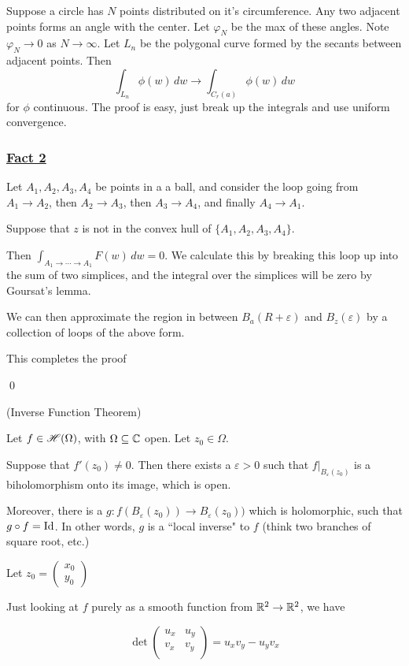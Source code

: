 \documentclass[x11names,reqno,14pt]{extarticle}
\newcommand{\oo}{{\infty}}
\begin{document}
Suppose a circle has $N$ points distributed on it's circumference. Any two adjacent points forms an angle with the center. Let $\varphi_N$ be the max of these angles. Note $\varphi_N\to0$ as $N\to\oo$. Let $L_n$ be the polygonal curve formed by the secants between adjacent points. Then 
\[
\int_{L_n}\phi(w)\, dw \to \int_{C_r(a)}\phi(w)\,dw
\]
for $\phi$ continuous. The proof is easy, just break up the integrals and use uniform convergence. 

\subsubsection*{\underline{Fact 2}}

Let $A_1, A_2, A_3, A_4$ be points in a a ball, and consider the loop going from $A_1\to A_2$, then $A_2\to A_3$, then $A_3\to A_4$, and finally $A_4\to A_1$. 

Suppose that $z$ is not in the convex hull of $\{A_1, A_2, A_3, A_4\}$. 

Then $\int_{A_1\to\cdots\to A_1}F(w)\,dw = 0$. We calculate this by breaking this loop up into the sum of two simplices, and the integral over the simplices will be zero by Goursat's lemma. 

We can then approximate the region in between $B_a(R + \varepsilon)$ and $B_z(\varepsilon)$ by a collection of loops of the above form. 

This completes the proof

\qed

\thm (Inverse Function Theorem)

Let $f \in \mathscr{H}(\Omega)$, with $\Omega\subseteq \mathbb{C}$ open. Let $z_0 \in \Omega$. 

Suppose that $f'(z_0) \neq 0$. Then there exists a $\varepsilon>0$ such that $f|_{B_\varepsilon(z_0)}$ is a biholomorphism onto its image, which is open. 

Moreover, there is a $g:f(B_{\varepsilon}(z_0))\to B_{\varepsilon}(z_0))$ which is holomorphic, such that $g \circ f = \operatorname{\mathrm{Id}}$. In other words, $g$ is a ``local inverse" to $f$ (think two branches of square root, etc.)


\proof

Let $z_0 = \begin{pmatrix} x_0 \\ y_0 \end{pmatrix}$

Just looking at $f$ purely as a smooth function from $\mathbb{R}^2\to\mathbb{R}^2$, we have

\[
\det\begin{pmatrix} u_x & u_y \\ v_x & v_y \\ \end{pmatrix} = u_xv_y - u_yv_x 
\]
\end{document}

